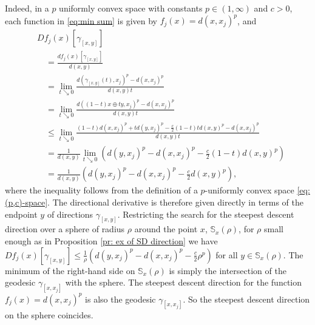 \documentclass{article}
\theoremstyle{plain}\newtheorem{theorem}{Theorem}[section]
\theoremstyle{plain}\newtheorem{definition}[theorem]{Definition}
\theoremstyle{plain}\newtheorem{lemma}[theorem]{Lemma}
\theoremstyle{definition}\newtheorem{remark}[theorem]{Remark}
\theoremstyle{definition}\newtheorem{example}[theorem]{Example}
\theoremstyle{plain}\newtheorem{proposition}[theorem]{Proposition}
\theoremstyle{plain}\newtheorem{inference}[theorem]{Inference}
\theoremstyle{plain}\newtheorem{corollary}[theorem]{Corollary}
\theoremstyle{plain}\newtheorem{assumption}[theorem]{Assumption}
\begin{document}
Indeed, in
a $p$ uniformly convex space with constants $p\in (1,\infty)$ and $c>0$, each
function in \eqref{eq:min sum} is given by $f_j(x)=d(x, x_j)^p$, and
\begin{equation}\label{eq:sd Frechet}
\begin{aligned}
        &Df_j(x)[\gamma_{[x,y]}]\\
        &\quad =\frac{df_j(x)[\gamma_{[x,y]}]}{d(x, y)}\\
        &\quad  = \lim_{t\searrow 0}\frac{d(\gamma_{[x,y]}(t), x_j)^p- d(x, x_j)^p}{d(x, y) t}\\
        &\quad  = \lim_{t\searrow 0}\frac{d((1-t)x\oplus t y, x_j)^p - d(x, x_j)^p}{d(x, y) t}\\
        &\quad  \leq \lim_{t\searrow 0}\frac{(1-t)d(x, x_j)^p + td(y, x_j)^p - \frac{c}{2}(1-t)td(x,y)^p - d(x, x_j)^p}{d(x, y) t}\\
        &\quad   = \frac{1}{d(x, y) }\lim_{t\searrow 0} \left(d(y, x_j)^p - d(x, x_j)^p - \frac{c}{2}(1-t)d(x,y)^p\right)\\
        &\quad  = \frac{1}{d(x, y)  } \left(d(y, x_j)^p - d(x, x_j)^p - \frac{c}{2}d(x,y)^p\right),
\end{aligned}
\end{equation}
where the inequality follows from the definition of a $p$-uniformly convex space \ref{eq: (p,c)-space}.  The directional derivative
is therefore given directly in terms of the endpoint $y$ of directions $\gamma_{[x,y]}$.   Restricting the search for the steepest
descent direction over a sphere of radius $\rho$ around the point $x$, $\mathbb{S}_{x}(\rho)$, for $\rho$ small enough as in
Proposition \ref{pr: ex of SD direction} we have
$Df_j(x)[\gamma_{[x,y]}]\leq \frac{1}{\rho } \left(d(y, x_j)^p - d(x, x_j)^p - \frac{c}{2}\rho^p\right)$ for
all $y\in \mathbb{S}_{x}(\rho)$.  The minimum of the right-hand side on 
$\mathbb{S}_{x}(\rho)$ is simply the intersection of the geodesic $\gamma_{[x,x_j]}$ 
with the sphere.  The steepest descent direction for the function $f_j(x)=d(x, x_j)^p$
is also the geodesic $\gamma_{[x,x_j]}$.  So the steepest descent direction on the 
sphere coincides. 
\end{document}
